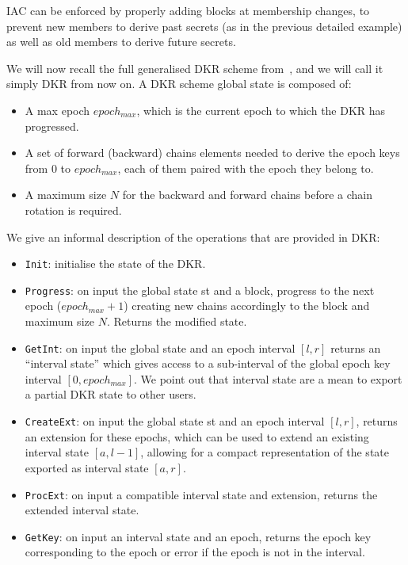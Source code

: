 IAC can be enforced by properly adding blocks at membership
changes, to prevent new members to derive past secrets (as in the previous detailed example)
as well as old members to derive future secrets.

We will now recall the full generalised DKR scheme from~\cite{GKP}, and we will call it simply DKR from now on. 
A DKR scheme global state is composed of:
\begin{itemize}
    \item A max epoch $epoch_{max}$, which is the current epoch to which the DKR has progressed.
    \item A set of forward (backward) chains elements needed to derive the epoch keys from 0 to $epoch_{max}$, each of them paired with the epoch they belong to.
    \item A maximum size $N$ for the backward and forward chains before a chain rotation is required.
\end{itemize}

We give an informal description of the operations that are provided in DKR:
\begin{itemize}
    \item \texttt{Init}: initialise the state of the DKR.
    \item \texttt{Progress}: on input the global state st and a block, progress to the next epoch ($epoch_{max} + 1$) creating new chains accordingly to the block and maximum size $N$. Returns the modified state.
    \item \texttt{GetInt}: on input the global state and an epoch interval $[l, r]$ returns an ``interval state'' which gives access to a sub-interval of the global epoch key interval $[0, epoch_{max}]$. We point out that interval state are a mean to export a partial DKR state to other users.
    \item \texttt{CreateExt}: on input the global state st and an epoch interval $[l, r]$, returns
    an extension for these epochs, which can be used to extend an existing interval state $[a, l - 1]$, allowing for a compact representation of the state exported as interval state $[a, r]$.
    \item \texttt{ProcExt}: on input a compatible interval state and extension, returns the
    extended interval state.
    \item \texttt{GetKey}: on input an interval state and an epoch, returns the epoch key corresponding to the epoch or error if the epoch is not in the interval.
\end{itemize}

